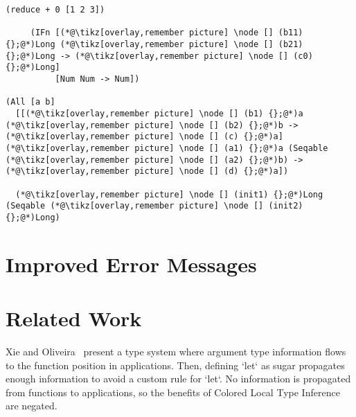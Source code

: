 \documentclass[9pt]{extarticle}
\begin{document}
\begin{lstlisting}
(reduce + 0 [1 2 3])

     (IFn [(*@\tikz[overlay,remember picture] \node [] (b11) {};@*)Long (*@\tikz[overlay,remember picture] \node [] (b21) {};@*)Long -> (*@\tikz[overlay,remember picture] \node [] (c0) {};@*)Long]
          [Num Num -> Num])

(All [a b]
  [[(*@\tikz[overlay,remember picture] \node [] (b1) {};@*)a (*@\tikz[overlay,remember picture] \node [] (b2) {};@*)b -> (*@\tikz[overlay,remember picture] \node [] (c) {};@*)a] (*@\tikz[overlay,remember picture] \node [] (a1) {};@*)a (Seqable (*@\tikz[overlay,remember picture] \node [] (a2) {};@*)b) -> (*@\tikz[overlay,remember picture] \node [] (d) {};@*)a])

  (*@\tikz[overlay,remember picture] \node [] (init1) {};@*)Long             (Seqable (*@\tikz[overlay,remember picture] \node [] (init2) {};@*)Long)

\end{lstlisting}

\section{Improved Error Messages}

\section{Related Work}

Xie and Oliveira~\cite{xie2018let} present a type system where
argument type information flows to the function position in applications.
Then, defining `let` as sugar propagates enough information to avoid
a custom rule for `let`.
No information is propagated from functions to applications, so the benefits
of Colored Local Type Inference are negated.
\end{document}
